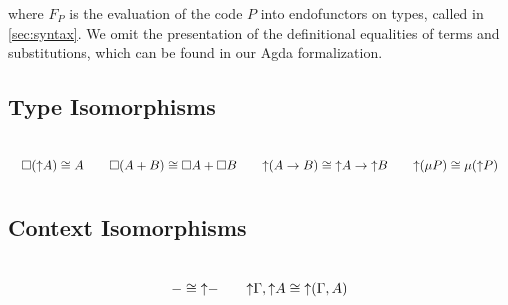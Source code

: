 where $F_P$ is the evaluation of the code $P$ into endofunctors on types, called
   in \cref{sec:syntax}. We omit the presentation of the
definitional equalities of terms and substitutions, which can be found
in our Agda formalization.

\subsection*{Type Isomorphisms}
\[\arraycolsep=10pt\def\arraystretch{2.8}
\begin{array}{cccc}
\square(\up A) \cong A & \square(A + B) \cong \square A + \square B &
\up(A \to B) \cong \up A \to \up B & \up(\mu P) \cong \mu(\up P)
\end{array}
\]

\subsection*{Context Isomorphisms}
\[\arraycolsep=10pt\def\arraystretch{2.8}
\begin{array}{cc}
- \cong \up -
&
\up \Gamma , \up A \cong \up (\Gamma , A)
\end{array}
\]



%